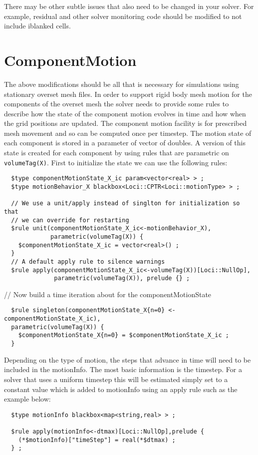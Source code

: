 \documentclass{article}
\begin{document}
There may be other subtle issues that also need to be changed in your
solver.  For example, residual and other solver monitoring code should
be modified to not include iblanked cells.

\section{ComponentMotion}

The above modifications should be all that is necessary for
simulations using stationary overset mesh files.  In order to support
rigid body mesh motion for the components of the overset mesh the
solver needs to provide some rules to describe how the state of the
component motion evolves in time and how when the grid positions are
updated.  The component motion facility is for prescribed mesh
movement and so can be computed once per timestep. The motion state of
each component is stored in a parameter of vector of doubles.  A
version of this state is created for each component by using rules
that are parametric on {\tt volumeTag(X)}.  First to initialize the
state we can use the following rules:

\begin{verbatim}
  $type componentMotionState_X_ic param<vector<real> > ;
  $type motionBehavior_X blackbox<Loci::CPTR<Loci::motionType> > ;

  // We use a unit/apply instead of singlton for initialization so that 
  // we can override for restarting
  $rule unit(componentMotionState_X_ic<-motionBehavior_X), 
             parametric(volumeTag(X)) {
    $componentMotionState_X_ic = vector<real>() ;
  }
  // A default apply rule to silence warnings
  $rule apply(componentMotionState_X_ic<-volumeTag(X))[Loci::NullOp], 
              parametric(volumeTag(X)), prelude {} ;
\end{verbatim}

// Now build a time iteration about for the componentMotionState
\begin{verbatim}
  $rule singleton(componentMotionState_X{n=0} <- componentMotionState_X_ic),
  parametric(volumeTag(X)) {
    $componentMotionState_X{n=0} = $componentMotionState_X_ic ;
  }
\end{verbatim}

Depending on the type of motion, the steps that advance in time will
need to be included in the motionInfo.  The most basic information is
the timestep.  For a solver that uses a uniform timestep this will be
estimated simply set to a constant value which is added to motionInfo
using an apply rule such as the example below:
\begin{verbatim}
  $type motionInfo blackbox<map<string,real> > ;

  $rule apply(motionInfo<-dtmax)[Loci::NullOp],prelude {
    (*$motionInfo)["timeStep"] = real(*$dtmax) ;
  } ;
\end{verbatim}
\end{document}
